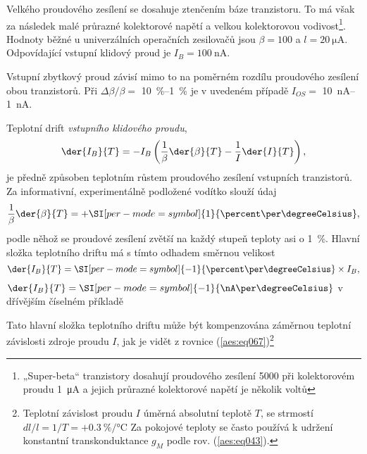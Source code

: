         Velkého proudového zesílení se dosahuje ztenčením báze tranzistoru. To má však za následek
        malé průrazné kolektorové napětí a velkou kolektorovou vodivost\footnote{ „Super-beta“
        tranzistory dosahují proudového zesílení \num{5000} při kolektorovém proudu \qty{1}{\uA} a
        jejich průrazné kolektorové napětí je několik voltů}. Hodnoty běžné u univerzálních
        operačních zesilovačů jsou \(\beta = \num{100}\) a \(l = \qty{20}{\uA}\). Odpovídající
        vstupní klidový proud je \(I_B = \qty{100}{\nA}\).

        Vstupní zbytkový proud závisí mimo to na poměrném rozdílu proudového zesílení obou
        tranzistorů. Při \(\Delta\beta/\beta =\) \SIrange{10}{1}{\percent} je v uvedeném případě
        \(I_{OS} =\) \SIrange{10}{1}{\nA}.

        Teplotní drift \emph{vstupního klidového proudu},
        \begin{equation}\label{aes:eq067}
          \der{I_B}{T} = -I_B\left(\dfrac{1}{\beta}\der{\beta}{T} - \dfrac{1}{I}\der{I}{T}\right),
        \end{equation}
        je předně způsoben teplotním růstem proudového zesílení vstupních tranzistorů. Za
        informativní, experimentálně podložené vodítko slouží údaj
        \begin{equation}\label{aes:eq068}
          \dfrac{1}{\beta}\der{\beta}{T} = +\SI[per-mode=symbol]{1}{\percent\per\degreeCelsius},
        \end{equation}
        podle něhož se proudové zesílení zvětší na každý stupeň teploty asi o \qty{1}{\percent}.
        Hlavní složka teplotního driftu má s tímto odhadem směrnou velikost
        \begin{equation}\label{aes:eq069}
          \der{I_B}{T} = \SI[per-mode=symbol]{-1}{\percent\per\degreeCelsius}\times I_B,
        \end{equation}
        \(\der{I_B}{T} =\SI[per-mode=symbol]{-1}{\nA\per\degreeCelsius}\) v dřívějším číselném
        příkladě

        Tato hlavní složka teplotního driftu může být kompenzována záměrnou teplotní závislosti
        zdroje proudu \(I\), jak je vidět z rovnice (\ref{aes:eq067})\footnote{Teplotní závislost
        proudu \(I\) úměrná absolutní teplotě \(T\), se strmostí \(dl/l = 1/T =
        +\SI[per-mode=symbol]{0.3}{\percent\per\degreeCelsius}\) Za pokojové teploty se často
        používá k udržení konstantní transkonduktance \(g_M\) podle rov. (\ref{aes:eq043}).}
        
